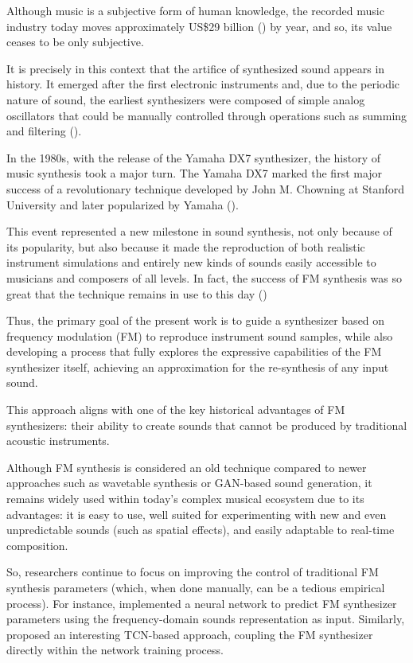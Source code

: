 \documentclass[10pt,conference]{IEEEtran}
\begin{document}
Although music is a subjective form of human knowledge, the recorded music industry today moves approximately US\$29 billion (\cite{ifpi2025}) by year, and so, its value ceases to be only subjective.

It is precisely in this context that the artifice of synthesized sound appears in history. It emerged after the first electronic instruments and, due to the periodic nature of sound, the earliest synthesizers were composed of simple analog oscillators that could be manually controlled through operations such as summing and filtering (\cite{holmes2016electronic}).

In the 1980s, with the release of the Yamaha DX7 synthesizer, the history of music synthesis took a major turn. The Yamaha DX7 marked the first major success of a revolutionary technique developed by John M. Chowning at Stanford University and later popularized by Yamaha (\cite{claesson2021resynthesis}).

This event represented a new milestone in sound synthesis, not only because of its popularity, but also because it made the reproduction of both realistic instrument simulations and entirely new kinds of sounds easily accessible to musicians and composers of all levels. In fact, the success of FM synthesis was so great that the technique remains in use to this day (\cite{holmes2016electronic})

Thus, the primary goal of the present work is to guide a synthesizer based on frequency modulation (FM) to reproduce instrument sound samples, while also developing a process that fully explores the expressive capabilities of the FM synthesizer itself, achieving an approximation for the re-synthesis of any input sound.

This approach aligns with one of the key historical advantages of FM synthesizers: their ability to create sounds that cannot be produced by traditional acoustic instruments.

Although FM synthesis is considered an old technique compared to newer approaches such as wavetable synthesis or GAN-based sound generation, it remains widely used within today’s complex musical ecosystem due to its advantages: it is easy to use, well suited for experimenting with new and even unpredictable sounds (such as spatial effects), and easily adaptable to real-time composition.

So, researchers continue to focus on improving the control of traditional FM synthesis parameters (which, when done manually, can be a tedious empirical process). For instance, \cite{claesson2021resynthesis} implemented a neural network to predict FM synthesizer parameters using the frequency-domain sounds representation as input. Similarly, \cite{steinmetz2022ddx7} proposed an interesting TCN-based approach, coupling the FM synthesizer directly within the network training process.
\end{document}
